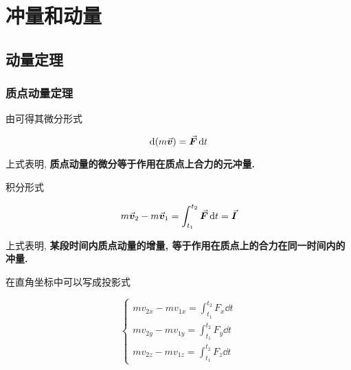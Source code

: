 \chapter{冲量和动量}

\begin{introduction}
	\item {}
	\item {}
	\item {}
	\item {}
\end{introduction}

\section{动量定理} \label{4.1}

\subsection{质点动量定理}

\begin{theorem}[质点动量定理] \label{C4-th1}
	由可得其微分形式
	
	\begin{equation}
		\dd{(m\va*{v})} = \va*{F} \dd{t} \label{C4-eq1}
	\end{equation}
	
	上式表明, \textbf{质点动量的微分等于作用在质点上合力的元冲量. }
	
	积分形式
	
	\begin{equation}
		m \va*{v}_2 - m \va*{v}_1 = \int_{t_1}^{t_2} \va*{F} \dd{t} = \va*{I} \label{C4-eq2}
	\end{equation}
	
	上式表明, \textbf{某段时间内质点动量的增量, 等于作用在质点上的合力在同一时间内的冲量. }
\end{theorem}

在直角坐标中可以写成投影式

\begin{equation}
	\begin{cases}
		m v_{2x} - m v_{1x} = \int_{t_1}^{t_2} F_x \dd{t} \\
		m v_{2y} - m v_{1y} = \int_{t_1}^{t_2} F_y \dd{t} \\
		m v_{2z} - m v_{1z} = \int_{t_1}^{t_2} F_z \dd{t} 
	\end{cases}
    \label{C4-eq3}
\end{equation}


